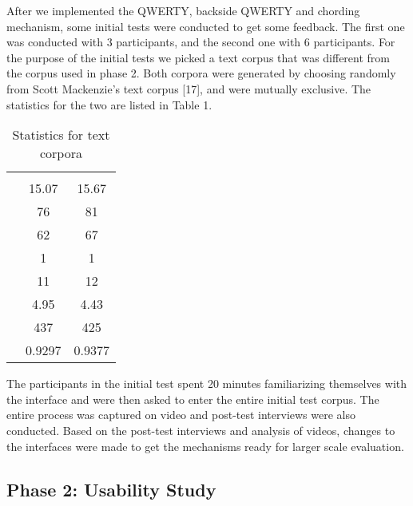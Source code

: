 After we implemented the QWERTY, backside QWERTY and chording mechanism, some initial tests were conducted to get some feedback. The first one was conducted with 3 participants, and the second one with 6 participants. For the purpose of the initial tests we picked a text corpus that was different from the corpus used in phase 2. Both corpora were generated by choosing randomly from Scott Mackenzie's text corpus [17], and were mutually exclusive. The statistics for the two are listed in Table 1.

\begin{table}
	\centering
		\begin{tabular}{rcc}
		                         & \begin{minipage}{2cm} \centering \color{grey}{Study corpus}\end{minipage} & \begin{minipage}{2cm} \centering \color{grey}{Initial test corpus}\end{minipage}  \\ 
			 \color{grey}{Average phrase length} & 15.07 & 15.67 \\ 
			 \color{grey}{Number of words} & 76 & 81 \\ 
			 \color{grey}{Unique words} & 62 & 67 \\ 
			 \color{grey}{Min. length of word} & 1 & 1 \\ 
			 \color{grey}{Max. length of word} & 11 & 12 \\ 
			 \color{grey}{Average word length} & 4.95 & 4.43 \\ 
			 \color{grey}{Number of characters} & 437 & 425 \\ 
			 \color{grey}{Correlation with English} & 0.9297 & 0.9377 \\ 
		\end{tabular}
	\caption{Statistics for text corpora}
	\label{tab:StatisticsForTextCorpora}
\end{table}

The participants in the initial test spent 20 minutes familiarizing themselves with the interface and were then asked to enter the entire initial test corpus. The entire process was captured on video and post-test interviews were also conducted. Based on the post-test interviews and analysis of videos, changes to the interfaces were made to get the mechanisms ready for larger scale evaluation.

\subsection{Phase 2: Usability Study}
